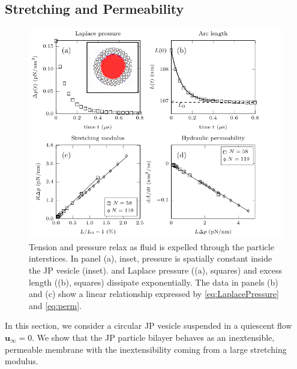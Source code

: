 \documentclass[lineno]{jfm}
\newcommand{\uu}{\mathbf{u}}
\begin{document}
\subsection{Stretching and Permeability}
\label{sec:ves_in_quiescent}

\begin{figure}
\centering
\includegraphics[width=\textwidth]{Figure2_part1_Wrapper.pdf}
\caption{\label{figure2part1} Tension and pressure relax as
  fluid is expelled through the particle interstices. In panel (a), inset, 
  pressure is spatially constant inside the JP vesicle (inset). and 
  Laplace pressure ((a), squares) and excess length ((b), squares) dissipate exponentially.  
  The data in panels (b) and (c) show a linear relationship expressed by
  \eqref{eq:LaplacePressure} and \eqref{eq:perm}. }
\end{figure}
In this section, we consider a circular JP vesicle suspended in a quiescent flow $\uu_{\infty} = 0$.
We show that the JP particle bilayer behaves as an inextensible, permeable membrane with
the inextensibility coming from a large stretching modulus.
\end{document}
